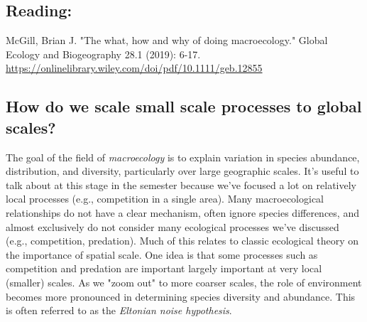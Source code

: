 \documentclass[12pt]{article}
\begin{document}
\subsection*{Reading:}

McGill, Brian J. "The what, how and why of doing macroecology." Global Ecology and Biogeography 28.1 (2019): 6-17. \\ \url{https://onlinelibrary.wiley.com/doi/pdf/10.1111/geb.12855} \\

\bigskip





\begin{center}
\noindent\hrulefill 
\end{center}



\clearpage



\subsection*{How do we scale small scale processes to global scales?}

The goal of the field of \textit{macroecology} is to explain variation in species abundance, distribution, and diversity, particularly over large geographic scales. It's useful to talk about at this stage in the semester because we've focused a lot on relatively local processes (e.g., competition in a single area). Many macroecological relationships do not have a clear mechanism, often ignore species differences, and almost exclusively do not consider many ecological processes we've discussed (e.g., competition, predation). Much of this relates to classic ecological theory on the importance of spatial scale. One idea is that some processes such as competition and predation are important largely important at very local (smaller) scales. As we "zoom out" to more coarser scales, the role of environment becomes more pronounced in determining species diversity and abundance. This is often referred to as the \textit{Eltonian noise hypothesis}. 
\end{document}
